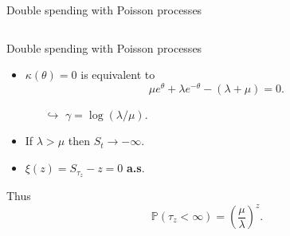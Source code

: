 \documentclass{beamer}
\begin{document}
\begin{frame}{Double spending with Poisson processes}
\begin{columns}
\begin{column}{0.5\textwidth}
\end{column}
\end{columns}
\end{frame}
\begin{frame}{Double spending with Poisson processes}

\begin{itemize}
\item $\kappa(\theta)=0$ is equivalent to
$$
\mu e^{\theta}+\lambda e^{-\theta}-(\lambda+\mu)=0.
$$

\begin{itemize}
\item[$\hookrightarrow$] $\gamma=\log(\lambda/\mu).$
\end{itemize}
\item If $\lambda>\mu$ then $S_t\rightarrow - \infty$.
\item $\xi(z)=S_{\tau_z}-z=0$ \textbf{a.s}.
\end{itemize}
Thus
$$\mathbb{P}(\tau_z<\infty)=\left(\frac{\mu}{\lambda}\right)^{z}.$$

\end{frame}
\end{document}
